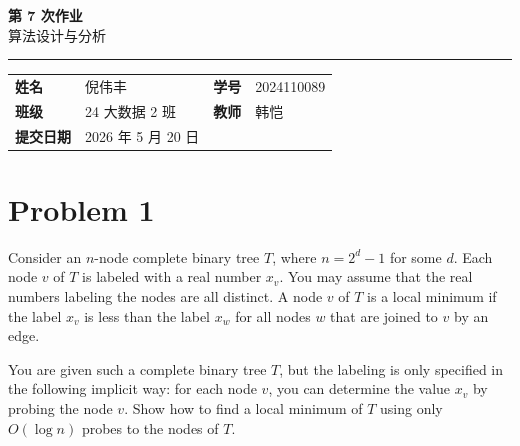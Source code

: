 \documentclass[12pt,a4paper]{article}
\newcommand{\course}{算法设计与分析}
\newcommand{\homeworktitle}{第 7 次作业}
\newcommand{\studentname}{倪伟丰}
\newcommand{\studentid}{2024110089}
\newcommand{\classname}{24 大数据 2 班}
\newcommand{\teacher}{韩恺}
\newcommand{\duedate}{2026 年 5 月 20 日}
\begin{document}
\begin{center}
  {\Huge\bfseries\color{mainblue}\homeworktitle}\\[0.6em]
  {\Large\course}\\[1.2em]
  {\color{linegray}\rule{0.9\textwidth}{0.8pt}}
\end{center}

\begin{infobox}
\begin{tabularx}{\textwidth}{>{\bfseries}p{2.2cm} X >{\bfseries}p{2.2cm} X}
姓名 & \studentname & 学号 & \studentid \\
班级 & \classname & 教师 & \teacher \\
提交日期 & \duedate &  &  \\
\end{tabularx}
\end{infobox}

\section{Problem 1}

Consider an $n$-node complete binary tree $T$, where $n=2^d-1$ for some $d$. Each node $v$ of $T$ is labeled with a real number $x_v$. You may assume that the real numbers labeling the nodes are all distinct. A node $v$ of $T$ is a local minimum if the label $x_v$ is less than the label $x_w$ for all nodes $w$ that are joined to $v$ by an edge.

You are given such a complete binary tree $T$, but the labeling is only specified in the following implicit way: for each node $v$, you can determine the value $x_v$ by probing the node $v$. Show how to find a local minimum of $T$ using only $O(\log n)$ probes to the nodes of $T$.
\end{document}
